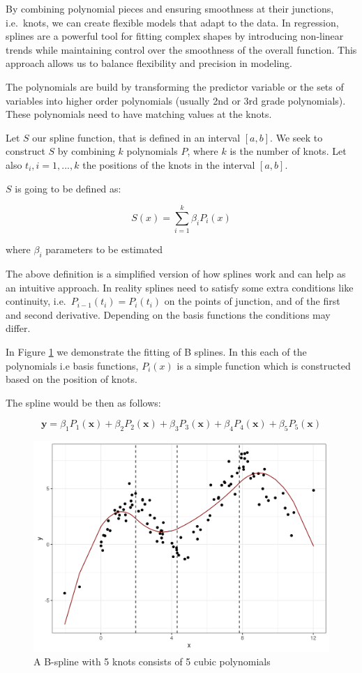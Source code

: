 \documentclass[
]{book}
\begin{document}
By combining polynomial pieces and ensuring smoothness at their junctions, i.e.~knots, we can create flexible models that adapt to the data. In regression, splines are a powerful tool for fitting complex shapes by introducing non-linear trends while maintaining control over the smoothness of the overall function. This approach allows us to balance flexibility and precision in modeling.

The polynomials are build by transforming the predictor variable or the sets of variables into higher order polynomials (usually 2nd or 3rd grade polynomials). These polynomials need to have matching values at the knots.

Let \(S\) our spline function, that is defined in an interval \([a,b]\). We seek to construct \(S\) by combining \(k\) polynomials \(P\), where \(k\) is the number of knots. Let also \(t_{i}, i = 1, ..., k\) the positions of the knots in the interval \([a,b]\).

\(S\) is going to be defined as:

\[
S(x) = \sum_{i = 1}^{k}\beta_iP_{i}(x)
\]

where \(\beta_i\) parameters to be estimated

The above definition is a simplified version of how splines work and can help as an intuitive approach. In reality splines need to satisfy some extra conditions like continuity, i.e.~\(P_{i-1}(t_{i}) = P_{i}(t_{i})\) on the points of junction, and of the first and second derivative. Depending on the basis functions the conditions may differ.

In Figure \ref{fig:naivespline} we demonstrate the fitting of B splines. In this each of the polynomials i.e basis functions, \(P_i(x)\) is a simple function which is constructed based on the position of knots.

The spline would be then as follows:

\[\mathbf{y} = \beta_1P_1(\mathbf{x}) + \beta_2P_2(\mathbf{x}) + \beta_3P_3(\mathbf{x}) + \beta_4P_4(\mathbf{x})+\beta_5P_5(\mathbf{x}) \]

\begin{figure}
\centering
\includegraphics{_bookdown_files/_main_files/figure-html/naivespline-1.png}
\caption{\label{fig:naivespline}A B-spline with 5 knots consists of 5 cubic polynomials}
\end{figure}
\end{document}
